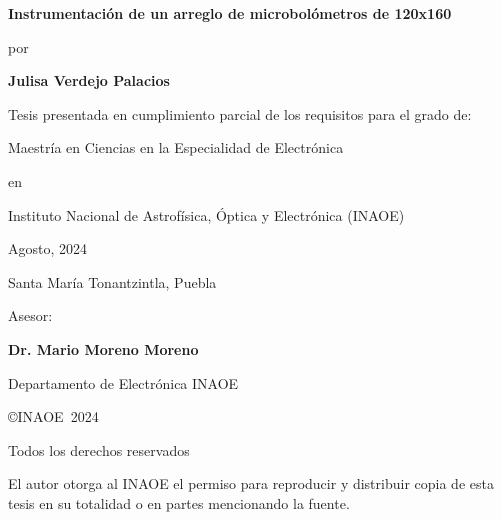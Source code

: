 \documentclass[12pt,a4paper]{report}
\newcommand{\Ptitle}{Instrumentación de un arreglo de microbolómetros de 120x160}
\newcommand{\Pauthor}{Julisa Verdejo Palacios}
\newcommand{\Pdegree}{Maestría en Ciencias en la Especialidad de Electrónica}
\newcommand{\Padvisor}{Dr. Mario Moreno Moreno}
\newcommand{\Pdepartmentadvisor}{Departamento de Electrónica INAOE}
\newcommand{\Pinstitution}{Instituto Nacional de Astrofísica, Óptica y Electrónica (INAOE)}
\newcommand{\Pmonth}{Agosto, }
\newcommand{\Pyear}{2024}
\newcommand{\Paddres}{Santa María Tonantzintla, Puebla}
\newlength{\vertical}\setlength{\vertical}{0.8cm}
\begin{document}
\begin{titlepage}
    \begin{center}
        {\Large\bf\Ptitle\par}
        \vspace{\vertical}
        
        {por\par}
        \vspace{\vertical}
        
        {\bf\Pauthor\par}
        \vspace{\vertical}
        
        {Tesis presentada en cumplimiento parcial de los requisitos para el grado de:\par}
        \vspace{\vertical}
        
        {\Pdegree\par}
        \vspace{\vertical}
        
        {en\par}
        \vspace{\vertical}
        
        {\Pinstitution\par}
        \vspace{\vertical}
        
        {\Pmonth\Pyear\par}
        \vspace{\vertical}
    
        {\Paddres\par}        
        \vspace{\vertical}
        
        {Asesor:\par}
        \vspace{\vertical}
        
        {\bf\Padvisor\par}
        {\Pdepartmentadvisor\par}
        \vspace{\vertical}
        
        {\copyright INAOE~\Pyear\par}
        {Todos los derechos reservados\par}
        {El autor otorga al INAOE el permiso para reproducir y distribuir copia de esta tesis en su totalidad o en partes mencionando la
fuente.\par}
    \end{center}

\end{titlepage}

\end{document}
